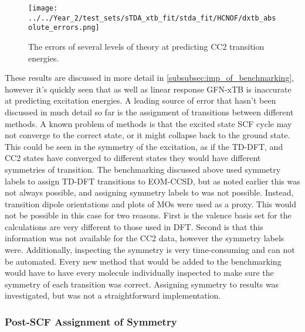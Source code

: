 \begin{figure}
    \label{fig:dxtb_absolute_errors}
    \texttt{[image: ../../Year\_2/test\_sets/sTDA\_xtb\_fit/stda\_fit/HCNOF/dxtb\_absolute\_errors.png]}
    \caption{The errors of several levels of theory at predicting CC2 transition
    energies.}
\end{figure}

These results are discussed in more detail in \ref{subsubsec:imp_of_benchmarking},
however it's quickly seen that \dxtb as well as linear response GFN-xTB is inaccurate 
at predicting excitation energies.
A leading source of error that hasn't been discussed in much detail so far is
the assignment of transitions between different methods. A known problem of \dscf
methods is that the excited state SCF cycle may not converge to the correct state,
or it might collapse back to the ground state. This could be seen in the symmetry
of the excitation, as if the TD-DFT, \dscf and CC2 states have converged to different 
states they would have different symmetries of transition. The benchmarking discussed
above used symmetry labels to assign TD-DFT transitions to EOM-CCSD, but as noted
earlier this was not always possible, and assigning symmetry labels to \dscf was 
not possible. Instead, transition dipole orientations and plots of MOs were used
as a proxy. This would not be possible in this case for two reasons. First is the
valence basis set for the \dxtb calculations are very different to those used in
DFT. Second is that this information was not available for the CC2 data, however
the symmetry labels were. Additionally, inspecting the symmetry is very time-consuming
and can not be automated. Every new method that would be added to the benchmarking
would have to have every molecule individually inspected to make sure the symmetry
of each transition was correct. Assigning symmetry to \dscf results was investigated,
but was not a straightforward implementation.

\subsubsection{Post-SCF Assignment of Symmetry}
\label{subsubsec:post_scf_symmetry}

